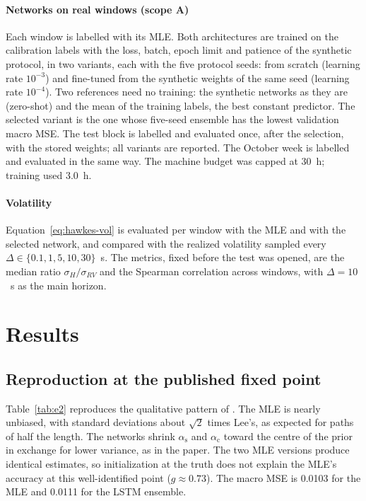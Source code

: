 \documentclass[preprint,12pt,authoryear]{elsarticle}
\newcommand{\aself}{\alpha_{\mathrm{s}}}
\newcommand{\across}{\alpha_{\mathrm{c}}}
\begin{document}
\paragraph{Networks on real windows (scope A)} Each window is labelled with its MLE. Both
architectures are trained on the calibration labels with the loss, batch, epoch limit and
patience of the synthetic protocol, in two variants, each with the five protocol seeds: from
scratch (learning rate $10^{-3}$) and fine-tuned from the synthetic weights of the same seed
(learning rate $10^{-4}$). Two references need no training: the synthetic networks as they
are (zero-shot) and the mean of the training labels, the best constant predictor. The
selected variant is the one whose five-seed ensemble has the lowest validation macro MSE.
The test block is labelled and evaluated once, after the selection, with the stored weights;
all variants are reported. The October week is labelled and evaluated in the same way. The
machine budget was capped at 30~h; training used 3.0~h.

\paragraph{Volatility} Equation~\eqref{eq:hawkes-vol} is evaluated per window with the
MLE and with the selected network, and compared with the realized volatility sampled every
$\Delta\in\{0.1,1,5,10,30\}$~s. The metrics, fixed before the test was opened, are the median
ratio $\sigma_H/\sigma_{RV}$ and the Spearman correlation across windows, with $\Delta=10$~s
as the main horizon.

\section{Results}
\label{sec:results}

\subsection{Reproduction at the published fixed point}

Table~\ref{tab:e2} reproduces the qualitative pattern of \citet{lee2023}. The MLE is nearly
unbiased, with standard deviations about $\sqrt2$ times Lee's, as expected for paths of half
the length. The networks shrink $\aself$ and $\across$ toward the centre of the prior in
exchange for lower variance, as in the paper. The two MLE versions produce identical
estimates, so initialization at the truth does not explain the MLE's accuracy at this
well-identified point ($g\approx0.73$). The macro MSE is 0.0103 for the MLE and 0.0111 for
the LSTM ensemble.
\end{document}
